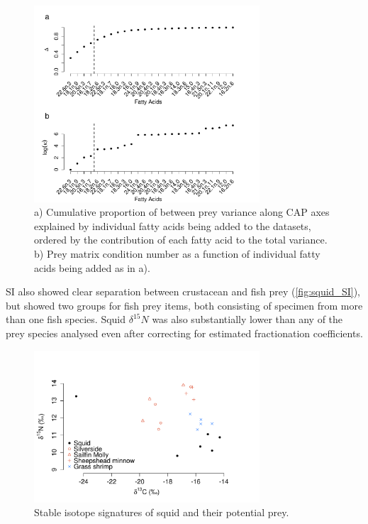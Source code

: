 \documentclass{article}%
\begin{document}
\begin{spacing}{1.9}
\begin{flushleft}
\begin{figure}
  \begin{center}  
      \includegraphics[width=0.75\textwidth]{figures/var_select.pdf}
      \caption{a) Cumulative proportion of between prey variance along CAP axes
      explained by individual fatty acids being added to the datasets,
      ordered by the contribution of each fatty acid to the total
      variance. b) Prey matrix condition number as a function of
      individual fatty acids being added as in a).}
    \label{fig:var_select}
  \end{center}
\end{figure}

SI also showed clear separation between crustacean and fish prey (\autoref{fig:squid_SI}),
but showed two groups for fish prey items, both consisting of specimen
from more than one fish species. Squid $\delta^{15}N$ was also substantially lower than any
of the prey species analysed even after correcting for estimated
fractionation coefficients.

\begin{figure}
  \begin{center}   
      \includegraphics[width=0.75\textwidth]{figures/SI_plot.pdf}
       \caption{Stable isotope signatures of squid and their potential prey.}
    \label{fig:squid_SI}
  \end{center}
\end{figure}


\end{flushleft}
\end{spacing}
\end{document}
